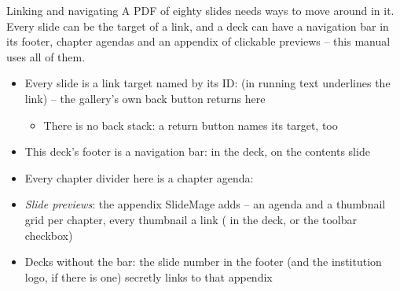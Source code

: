 
\begin{standardframe}{Linking and navigating}
	\small
	A PDF of eighty slides needs ways to move around in it. Every slide can be
	the target of a link, and a deck can have a navigation bar in its footer,
	chapter agendas and an appendix of clickable previews -- this manual uses
	all of them.
	\begin{itemize}
		\item Every slide is a link target named by its ID:  (in running text  underlines the link) \hyperlink{1td}{} -- the gallery's own back button returns here
		\begin{itemize}
			\item There is no back stack: a return button names its target, too
		\end{itemize}
		\item This deck's footer is a navigation bar: \SMCode{[...]} in the deck,  on the contents slide
		\item Every chapter divider here is a chapter agenda: 
		\item \emph{Slide previews}: the appendix SlideMage adds -- an agenda and a thumbnail grid per chapter, every thumbnail a link ( in the deck, or the toolbar checkbox)
		\item Decks without the bar: the slide number in the footer (and the institution logo, if there is one) secretly links to that appendix
	\end{itemize}
\end{standardframe}
